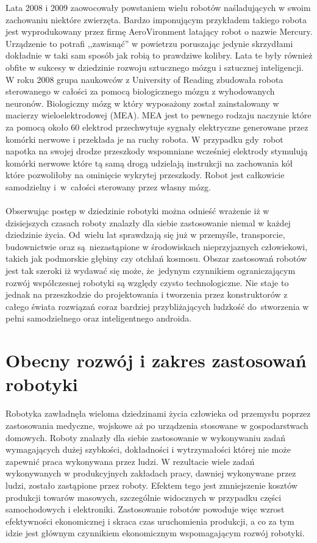 Lata 2008 i 2009 zaowocowały powstaniem wielu robotów naśladujących w swoim
zachowaniu niektóre zwierzęta. Bardzo imponującym przykładem takiego robota jest
wyprodukowany przez firmę AeroVironment latający robot o nazwie Mercury.
Urządzenie to potrafi ,,zawisnąć'' w powietrzu poruszając jedynie skrzydłami
dokładnie w taki sam sposób jak robią to prawdziwe kolibry. Lata te były również
obfite w sukcesy w dziedzinie rozwoju sztucznego mózgu i sztucznej inteligencji.
W roku 2008 grupa naukowców z University of Reading zbudowała robota sterowanego
w całości za pomocą biologicznego mózgu z wyhodowanych neuronów. Biologiczny mózg
w który wyposażony został zainstalowany w macierzy wieloelektrodowej (MEA). MEA
jest to pewnego rodzaju naczynie które za pomocą około 60 elektrod przechwytuje
sygnały elektryczne generowane przez komórki nerwowe i przekłada je na ruchy
robota. W przypadku gdy~robot napotka na swojej drodze przeszkody wspomniane
wcześniej elektrody stymulują komórki nerwowe które tą samą drogą udzielają
instrukcji na zachowania kół które pozwoliłoby na ominięcie wykrytej przeszkody.
Robot jest
całkowicie samodzielny i~w~całości sterowany przez własny mózg.\\
\\
Obserwując postęp w dziedzinie robotyki można odnieść wrażenie iż w dzisiejszych
czasach roboty znalazły dla siebie zastosowanie niemal w każdej dziedzinie życia.
Od~wielu lat sprawdzają się już w przemyśle, transporcie, budownictwie oraz
są~niezastąpione w środowiskach nieprzyjaznych człowiekowi, takich jak podmorskie
głębiny czy otchłań kosmosu. Obszar zastosowań robotów jest tak szeroki iż
wydawać się może, że~jedynym czynnikiem ograniczającym rozwój współczesnej
robotyki są względy czysto technologiczne. Nie staje to jednak na przeszkodzie do
projektowania i tworzenia przez konstruktorów z całego świata rozwiązań coraz
bardziej przybliżających ludzkość do~stworzenia w pełni samodzielnego oraz
inteligentnego androida.
\section{Obecny rozwój i zakres zastosowań robotyki}
Robotyka zawładnęła wieloma dziedzinami życia człowieka od przemysłu poprzez
zastosowania medyczne, wojskowe aż po urządzenia stosowane w gospodarstwach
domowych. Roboty znalazły dla siebie zastosowanie w wykonywaniu zadań
wymagających dużej szybkości, dokładności i wytrzymałości której nie może
zapewnić praca wykonywana przez ludzi. W rezultacie wiele zadań wykonywanych w
produkcyjnych zakładach pracy, dawniej wykonywane przez ludzi, zostało zastąpione
przez roboty. Efektem tego jest zmniejszenie kosztów produkcji towarów masowych,
szczególnie widocznych w przypadku części samochodowych i elektroniki.
Zastosowanie robotów powoduje więc wzrost efektywności ekonomicznej i skraca czas
uruchomienia produkcji, a co za tym idzie jest głównym czynnikiem ekonomicznym
wspomagającym rozwój robotyki.


